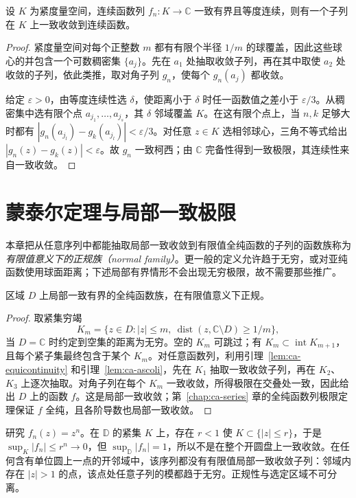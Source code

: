 \begin{lemma}
\label{lem:ca-ascoli}
设 $K$ 为紧度量空间，连续函数列 $f_n:K\to\mathbb C$ 一致有界且等度连续，则有一个子列在 $K$ 上一致收敛到连续函数。
\end{lemma}
\begin{proof}
紧度量空间对每个正整数 $m$ 都有有限个半径 $1/m$ 的球覆盖，因此这些球心的并包含一个可数稠密集 $\{a_j\}$。先在 $a_1$ 处抽取收敛子列，再在其中取使 $a_2$ 处收敛的子列，依此类推，取对角子列 $g_n$，使每个 $g_n(a_j)$ 都收敛。

给定 $\varepsilon>0$，由等度连续性选 $\delta$，使距离小于 $\delta$ 时任一函数值之差小于 $\varepsilon/3$。从稠密集中选有限个点 $a_{j_1},\ldots,a_{j_s}$，其 $\delta$ 邻域覆盖 $K$。在这有限个点上，当 $n,k$ 足够大时都有 $|g_n(a_{j_l})-g_k(a_{j_l})|<\varepsilon/3$。对任意 $z\in K$ 选相邻球心，三角不等式给出 $|g_n(z)-g_k(z)|<\varepsilon$。故 $g_n$ 一致柯西；由 $\mathbb C$ 完备性得到一致极限，其连续性来自一致收敛。
\end{proof}

\section{蒙泰尔定理与局部一致极限}

本章把从任意序列中都能抽取局部一致收敛到有限值全纯函数的子列的函数族称为\emph{有限值意义下的正规族（normal family）}。更一般的定义允许趋于无穷，或对亚纯函数使用球面距离；下述局部有界情形不会出现无穷极限，故不需要那些推广。

\begin{theorem}
\label{thm:ca-montel}
区域 $D$ 上局部一致有界的全纯函数族，在有限值意义下正规。
\end{theorem}
\begin{proof}
取紧集穷竭
\[
 K_m=\{z\in D:|z|\le m,\ \operatorname{dist}(z,\mathbb C\setminus D)\ge1/m\},
\]
当 $D=\mathbb C$ 时约定到空集的距离为无穷。空的 $K_m$ 可跳过；有 $K_m\subset\operatorname{int}K_{m+1}$，且每个紧子集最终包含于某个 $K_m$。对任意函数列，利用引理~\ref{lem:ca-equicontinuity} 和引理~\ref{lem:ca-ascoli}，先在 $K_1$ 抽取一致收敛子列，再在 $K_2$、$K_3$ 上逐次抽取。对角子列在每个 $K_m$ 一致收敛，所得极限在交叠处一致，因此给出 $D$ 上的函数 $f$。这是局部一致收敛；第~\ref{chap:ca-series} 章的全纯函数列极限定理保证 $f$ 全纯，且各阶导数也局部一致收敛。
\end{proof}

\begin{example}[同一序列在不同区域上的表现]
研究 $f_n(z)=z^n$。在 $\mathbb D$ 的紧集 $K$ 上，存在 $r<1$ 使 $K\subset\{|z|\le r\}$，于是 $\sup_K|f_n|\le r^n\to0$，但 $\sup_{\mathbb D}|f_n|=1$，所以不是在整个开圆盘上一致收敛。在任何含有单位圆上一点的开邻域中，该序列都没有有限值局部一致收敛子列：邻域内存在 $|z|>1$ 的点，该点处任意子列的模都趋于无穷。正规性与选定区域不可分离。
\end{example}

